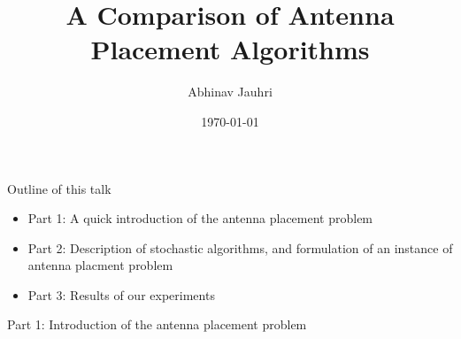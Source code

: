 \documentclass{beamer}
\title{\color{univred} A Comparison of Antenna Placement Algorithms}
\author{Abhinav Jauhri}
\date{\today}
\begin{document}
    \begin{frame}
        \color{univred}
        \titlepage
    \end{frame}

    \begin{frame}{Outline of this talk}
        \begin{itemize}
            \setlength\itemsep{2em}
            \item Part 1: A quick introduction of the antenna placement problem
            \item Part 2: Description of stochastic algorithms, and formulation of an instance of antenna placment problem
            \item Part 3: Results of our experiments
        \end{itemize}
    \end{frame}

    \begin{frame}{\null}
        \begin{tcolorbox}[colback=green!5]
            \centering\Huge
            Part 1: Introduction of the antenna placement problem
        \end{tcolorbox}
    \end{frame}
\end{document}
